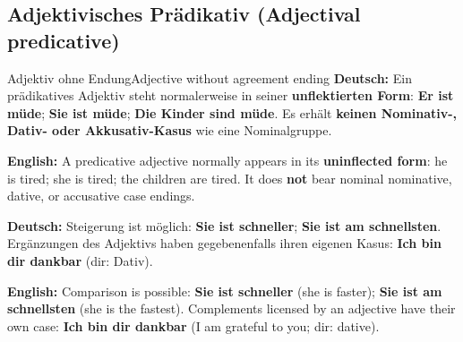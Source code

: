 \documentclass[a4paper,11pt]{article}
\newcommand{\GermanText}[1]{\textbf{Deutsch: }#1\par}
\newcommand{\EnglishText}[1]{{\small\color{SoftGray}\textbf{English: }#1\par}}
\begin{document}
\subsection{Adjektivisches Prädikativ \textnormal{(Adjectival predicative)}}
\begin{grammarentry}{Adjektiv ohne Endung}{Adjective without agreement ending}
\GermanText{Ein prädikatives Adjektiv steht normalerweise in seiner \textbf{unflektierten Form}: \textbf{Er ist müde}; \textbf{Sie ist müde}; \textbf{Die Kinder sind müde}. Es erhält \textbf{keinen Nominativ-, Dativ- oder Akkusativ-Kasus} wie eine Nominalgruppe.}
\EnglishText{A predicative adjective normally appears in its \textbf{uninflected form}: he is tired; she is tired; the children are tired. It does \textbf{not} bear nominal nominative, dative, or accusative case endings.}
\GermanText{Steigerung ist möglich: \textbf{Sie ist schneller}; \textbf{Sie ist am schnellsten}. Ergänzungen des Adjektivs haben gegebenenfalls ihren eigenen Kasus: \textbf{Ich bin dir dankbar} (dir: Dativ).}
\EnglishText{Comparison is possible: \textbf{Sie ist schneller} (she is faster); \textbf{Sie ist am schnellsten} (she is the fastest). Complements licensed by an adjective have their own case: \textbf{Ich bin dir dankbar} (I am grateful to you; dir: dative).}
\end{grammarentry}
\end{document}
